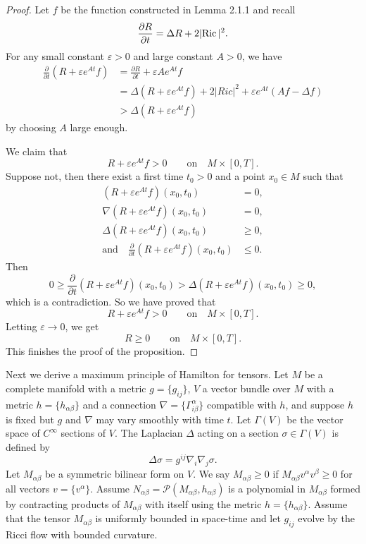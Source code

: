 \begin{proof}
Let $f$ be the function constructed in Lemma 2.1.1 and recall
$$
\frac{\partial R}{\partial t}=\Delta R+2|{\rm Ric}\,|^2.
$$
For any small constant $\varepsilon>0$ and large constant $A>0$,
we have
\begin{align*}
\frac{\partial}{\partial t}(R+\varepsilon e^{At}f)
&  = \frac{\partial R}{\partial t}+\varepsilon Ae^{At}f\\
&  = \Delta(R+\varepsilon e^{At}f)+2|Ric|^2+\varepsilon
e^{At}(Af-\Delta f)\\
& > \Delta(R+\varepsilon e^{At}f)
\end{align*}
by choosing $A$ large enough.

We claim that
$$
R+\varepsilon e^{At}f>0\qquad \text{on}\quad M\times[0,T].
$$
Suppose not, then there exist a first time $t_0>0$ and a point
$x_0\in M$ such that
\begin{align*}
(R+\varepsilon e^{At}f)(x_0,t_0)&=0,\\
\nabla(R+\varepsilon e^{At}f)(x_0,t_0)&=0,\\
\Delta(R+\varepsilon e^{At}f)(x_0,t_0)&\ge 0,\\
\text{and}\quad \frac{\partial}{\partial t}(R+\varepsilon
e^{At}f)(x_0,t_0)&\le 0.
\end{align*}
Then
$$
0\ge \frac{\partial}{\partial t}(R+\varepsilon
e^{At}f)(x_0,t_0)>\Delta(R+\varepsilon e^{At}f)(x_0,t_0)\ge 0,
$$
which is a contradiction. So we have proved that
$$
R+\varepsilon e^{At}f>0\qquad \text{on}\quad M\times[0,T].
$$
Letting $\varepsilon\rightarrow 0$, we get
$$
R\ge 0\qquad \text{on}\quad M\times[0,T].
$$
This finishes the proof of the proposition.
\end{proof}

Next we derive a maximum principle of Hamilton for tensors. Let
$M$ be a complete manifold with a metric $g=\{g_{ij}\}$, $V$ a
vector bundle over $M$ with a metric $h=\{h_{\alpha\beta}\}$ and a
connection $\nabla=\{\Gamma^\alpha_{i\beta}\}$ compatible with
$h$, and suppose $h$ is fixed but $g$ and $\nabla$ may vary
smoothly with time $t$. Let $\Gamma(V)$ be the vector space of
$C^\infty$ sections of $V$. The Laplacian $\Delta$ acting on a
section $\sigma\in\Gamma(V)$ is defined by
$$
\Delta\sigma=g^{ij}\nabla_i\nabla_j\sigma.
$$
Let $M_{\alpha\beta}$ be a symmetric bilinear form on $V$. We say
$M_{\alpha\beta}\ge 0$ if $M_{\alpha\beta}v^\alpha v^\beta\ge 0$
for all vectors $v=\{v^\alpha\}$. Assume
$N_{\alpha\beta}={\mathcal{P}}(M_{\alpha\beta},h_{\alpha\beta})$
is a polynomial in $M_{\alpha\beta}$ formed by contracting
products of $M_{\alpha\beta}$ with itself using the metric
$h=\{h_{\alpha\beta}\}$. Assume that the tensor $M_{\alpha\beta}$
is uniformly bounded in space-time and let $g_{ij}$ evolve by the
Ricci flow with bounded curvature.

